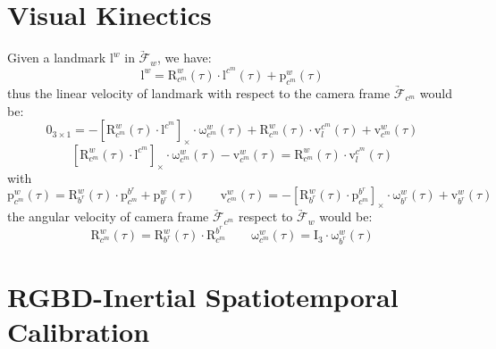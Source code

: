 \documentclass[12pt, onecolumn]{article}
\newcommand\liehat[1]{\left[ #1 \right]_\times}
\newcommand\bsm[1]{\boldsymbol{\mathrm{#1}}}
\newcommand\rotation[2]{{\bsm{R}_{#1}^{#2}}}
\newcommand\angvel[2]{{\bsm{\omega}_{#1}^{#2}}}
\newcommand\translation[2]{{\bsm{p}_{#1}^{#2}}}
\newcommand\linvel[2]{{\bsm{v}_{#1}^{#2}}}
\newcommand\coordframe[1]{\underrightarrow{\mathcal{F}}_{#1}}
\begin{document}
	\section{Visual Kinectics}
	Given a landmark $\bsm{l}^{w}$ in $\coordframe{w}$, we have:
	\begin{equation}
	\bsm{l}^{w}=\rotation{c^m}{w}(\tau)\cdot\bsm{l}^{c^m}(\tau)+\translation{c^m}{w}(\tau)
	\end{equation}
	thus the linear velocity of landmark with respect to the camera frame $\coordframe{c^m}$ would be:
	\begin{equation}
	\bsm{0}_{3\times 1}=-\liehat{\rotation{c^m}{w}(\tau)\cdot\bsm{l}^{c^m}}\cdot\angvel{c^m}{w}(\tau)+\rotation{c^m}{w}(\tau)\cdot\linvel{l}{c^m}(\tau)+\linvel{c^m}{w}(\tau)
	\end{equation}
	\begin{equation}
	\liehat{\rotation{c^m}{w}(\tau)\cdot\bsm{l}^{c^m}}\cdot\angvel{c^m}{w}(\tau)-\linvel{c^m}{w}(\tau)=\rotation{c^m}{w}(\tau)\cdot\linvel{l}{c^m}(\tau)
	\end{equation}
	with
	\begin{equation}
	\translation{c^m}{w}(\tau)=\rotation{b^r}{w}(\tau)\cdot\translation{c^m}{b^r}+\translation{b^r}{w}(\tau)
	\qquad
	\linvel{c^m}{w}(\tau)=-\liehat{\rotation{b^r}{w}(\tau)\cdot\translation{c^m}{b^r}}\cdot\angvel{b^r}{w}(\tau)+\linvel{b^r}{w}(\tau)
	\end{equation}
	the angular velocity of camera frame $\coordframe{c^m}$ respect to $\coordframe{w}$ would be:
	\begin{equation}
	\rotation{c^m}{w}(\tau)=\rotation{b^r}{w}(\tau)\cdot\rotation{c^m}{b^r}
	\qquad
	\angvel{c^m}{w}(\tau)=\bsm{I}_{3}\cdot\angvel{b^r}{w}(\tau)
	\end{equation}
	
\section{RGBD-Inertial Spatiotemporal Calibration}
\end{document}
